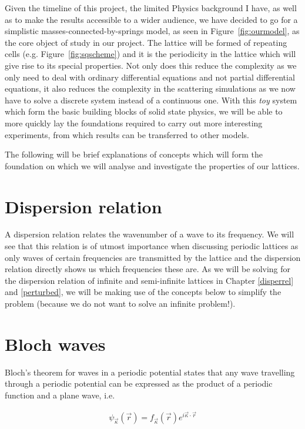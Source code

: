 Given the timeline of this project, the limited Physics background I have, as
well as to make the results accessible to a wider audience, we have decided to
go for a simplistic masses-connected-by-springs model, as seen in
Figure~\ref{fig:ourmodel}, as the core object of study in our project. The
lattice will be formed of repeating cells (e.g. Figure~\ref{fig:sqscheme}) and
it is the periodicity in the lattice which will give rise to its special
properties. Not only does this reduce the complexity as we only need to deal
with ordinary differential equations and not partial differential equations, it
also reduces the complexity in the scattering simulations as we now have to
solve a discrete system instead of a continuous one. With this \textit{toy}
system which form the basic building blocks of solid state physics, we will be
able to more quickly lay the foundations required to carry out more interesting
experiments, from which results can be transferred to other models.

The following will be brief explanations of concepts which will form the
foundation on which we will analyse and investigate the properties of our
lattices.

\section{Dispersion relation}
\label{disperbg}
A dispersion relation relates the wavenumber of a wave to its frequency. We
will see that this relation is of utmost importance when discussing periodic
lattices as only waves of certain frequencies are transmitted by the lattice
and the dispersion relation directly shows us which frequencies these are. As
we will be solving for the dispersion relation of infinite and semi-infinite
lattices in Chapter \ref{disperrel} and \ref{perturbed}, we will be making use
of the concepts below to simplify the problem (because we do not want to solve
an infinite problem!).

\section{Bloch waves}
\label{blochbg}
Bloch's theorem for waves in a periodic potential\cite{bloch} states that any
wave travelling through a periodic potential can be expressed as the product of
a periodic function and a plane wave,\cite{kittel} i.e.

\begin{align}
  \psi_{\vec{\kappa}}(\vec{r})=f_{\vec{\kappa}}(\vec{r})e^{i\vec{\kappa}\cdot\vec{r}}
\label{eq:blochwave}
\end{align}

